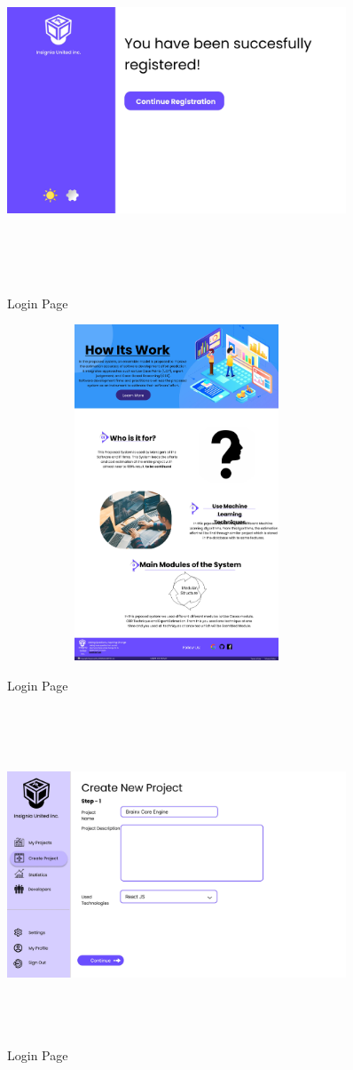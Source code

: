 \begin{figure}[H]
\includegraphics[height=10cm, width=0.9\textwidth]{./images/prototype/0008}
\centering 
\caption{Login Page}
\label{fig:prototype1}


\pagebreak
\includegraphics[height=10cm, width=0.9\textwidth]{./images/prototype/0009}
\centering 
\caption{Login Page}
\label{fig:prototype1}

\includegraphics[height=10cm, width=0.9\textwidth]{./images/prototype/0010}
\centering 
\caption{Login Page}
\label{fig:prototype1}



\end{figure}

